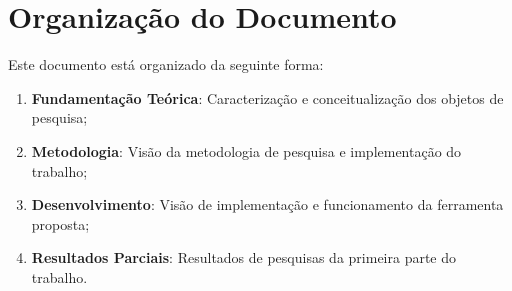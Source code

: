 \section{Organização do Documento}
\label{sec:org}

Este documento está organizado da seguinte forma:

\begin{enumerate}
  \item \textbf{Fundamentação Teórica}: Caracterização e conceitualização dos
    objetos de pesquisa;
  \item \textbf{Metodologia}: Visão da metodologia de pesquisa e implementação
    do trabalho;
  \item \textbf{Desenvolvimento}: Visão de implementação e funcionamento da
    ferramenta proposta;
  \item \textbf{Resultados Parciais}: Resultados de pesquisas da primeira
    parte do trabalho.
\end{enumerate}

